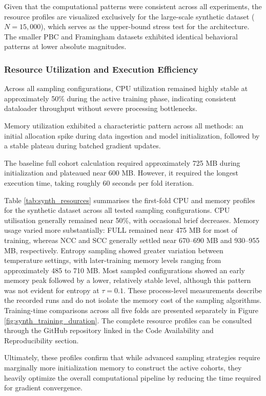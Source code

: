 \documentclass[a4paper,twoside,12pt]{report}
\begin{document}
Given that the computational patterns were consistent across all experiments, the resource profiles are visualized exclusively for the large-scale synthetic dataset ($N=15,000$), which serves as the upper-bound stress test for the architecture. The smaller PBC and Framingham datasets exhibited identical behavioral patterns at lower absolute magnitudes.

\subsubsection{Resource Utilization and Execution Efficiency}

Across all sampling configurations, CPU utilization remained highly stable at approximately 50\% during the active training phase, indicating consistent dataloader throughput without severe processing bottlenecks. 

Memory utilization exhibited a characteristic pattern across all methods: an initial allocation spike during data ingestion and model initialization, followed by a stable plateau during batched gradient updates. 

The baseline full cohort calculation required approximately 725 MB during initialization and plateaued near 600 MB. However, it required the longest execution time, taking roughly 60 seconds per fold iteration.

Table \ref{tab:synth_resources} summarises the first-fold CPU and memory profiles for the synthetic dataset across all tested sampling configurations. CPU utilisation generally remained near 50\%, with occasional brief decreases. Memory usage varied more substantially: FULL remained near 475 MB for most of training, whereas NCC and SCC generally settled near 670--690 MB and 930--955 MB, respectively. Entropy sampling showed greater variation between temperature settings, with later-training memory levels ranging from approximately 485 to 710 MB. Most sampled configurations showed an early memory peak followed by a lower, relatively stable level, although this pattern was not evident for entropy at $\tau=0.1$. These process-level measurements describe the recorded runs and do not isolate the memory cost of the sampling algorithms. Training-time comparisons across all five folds are presented separately in Figure \ref{fig:synth_training_duration}. The complete resource profiles can be consulted through the GitHub repository linked in the Code Availability and Reproducibility section.

Ultimately, these profiles confirm that while advanced sampling strategies require marginally more initialization memory to construct the active cohorts, they heavily optimize the overall computational pipeline by reducing the time required for gradient convergence.
\end{document}
